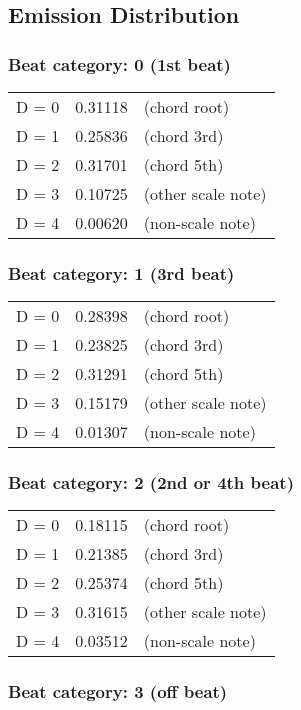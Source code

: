 \subsection{Emission Distribution}

\subsubsection*{Beat category: 0 (1st beat)}


\begin{tabular}{l l l}
D = 0 & 0.31118 & (chord root)\\
D = 1 & 0.25836 & (chord 3rd)\\
D = 2 & 0.31701 & (chord 5th)\\
D = 3 & 0.10725 & (other scale note)\\
D = 4 & 0.00620 & (non-scale note)\\
\end{tabular}


\subsubsection*{Beat category: 1 (3rd beat)}


\begin{tabular}{l l l}
D = 0 & 0.28398 & (chord root)\\
D = 1 & 0.23825 & (chord 3rd)\\
D = 2 & 0.31291 & (chord 5th)\\
D = 3 & 0.15179 & (other scale note)\\
D = 4 & 0.01307 & (non-scale note)\\
\end{tabular}


\subsubsection*{Beat category: 2 (2nd or 4th beat)}


\begin{tabular}{l l l}
D = 0 & 0.18115 & (chord root)\\
D = 1 & 0.21385 & (chord 3rd)\\
D = 2 & 0.25374 & (chord 5th)\\
D = 3 & 0.31615 & (other scale note)\\
D = 4 & 0.03512 & (non-scale note)\\
\end{tabular}


\subsubsection*{Beat category: 3 (off beat)}



